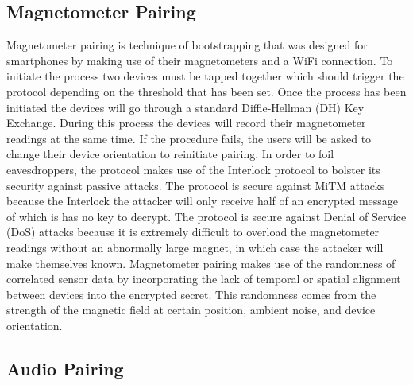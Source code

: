 \subsection{Magnetometer Pairing}
Magnetometer pairing is technique of bootstrapping that was designed for smartphones by making use of their magnetometers and a WiFi connection. To initiate the process two devices must be tapped together which should trigger the protocol depending on the threshold that has been set. Once the process has been initiated the devices will go through a standard Diffie-Hellman (DH) Key Exchange. During this process the devices will record their magnetometer readings at the same time. If the procedure fails, the users will be asked to change their device orientation to reinitiate pairing.  In order to foil eavesdroppers, the protocol makes use of the Interlock protocol to bolster its security against passive attacks. The protocol is secure against MiTM attacks because the Interlock the attacker will only receive half of an encrypted message of which is has no key to decrypt. The protocol is secure against Denial of Service (DoS) attacks because it is extremely difficult to overload the magnetometer readings without an abnormally large magnet, in which case the attacker will make themselves known. Magnetometer pairing makes use of the randomness of correlated sensor data by incorporating the lack of temporal or spatial alignment between devices into the encrypted secret. This randomness comes from the strength of the magnetic field at certain position, ambient noise, and device orientation.

\subsection{Audio Pairing}
